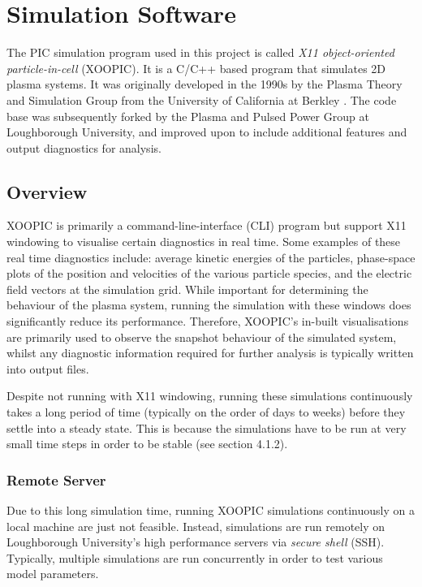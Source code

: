 \chapter{Simulation Software}
\label{ch:xoopic}


The PIC simulation program used in this project is called \textit{X11 object-oriented particle-in-cell} (XOOPIC). It is a C/C++ based program that simulates 2D plasma systems. It was originally developed in the 1990s by the Plasma Theory and Simulation Group from the University of California at Berkley \cite{Verboncoeur1995}. The code base was subsequently forked by the Plasma and Pulsed Power Group at Loughborough University, and improved upon to include additional features and output diagnostics for analysis.


\section{Overview}

XOOPIC is primarily a command-line-interface (CLI) program but support X11 windowing to visualise certain diagnostics in real time. Some examples of these real time diagnostics include: average kinetic energies of the particles, phase-space plots of the position and velocities of the various particle species,
and the electric field vectors at the simulation grid. While important for determining the behaviour of the plasma system, running the simulation with these windows does significantly reduce its performance. Therefore, XOOPIC's in-built visualisations are primarily used to observe the snapshot behaviour of the simulated system, whilst any diagnostic information required for further analysis is typically written into output files.

Despite not running with X11 windowing, running these simulations continuously takes a long period of time (typically on the order of days to weeks) before they settle into a steady state. This is because the simulations have to be run at very small time steps in order to be stable (see section 4.1.2). 

\subsection{Remote Server}

Due to this long simulation time, running XOOPIC simulations continuously on a local machine are just not feasible. Instead, simulations are run remotely on Loughborough University's high performance servers via \textit{secure shell} (SSH). Typically, multiple simulations are run concurrently in order to test various model parameters.

